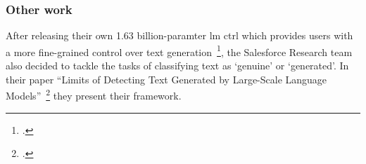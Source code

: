 \subsubsection{Other work}
\label{sub:other_work}

After releasing their own 1.63 billion-paramter \gls{lm} \gls{ctrl} which provides users with a more fine-grained control over text generation~\footcite{keskar2019ctrl}, the Salesforce Research team also decided to tackle the tasks of classifying text as `genuine' or `generated'. In their paper ``Limits of Detecting Text Generated by Large-Scale Language Models''~\footcite{varshney2020limits} they present their framework.